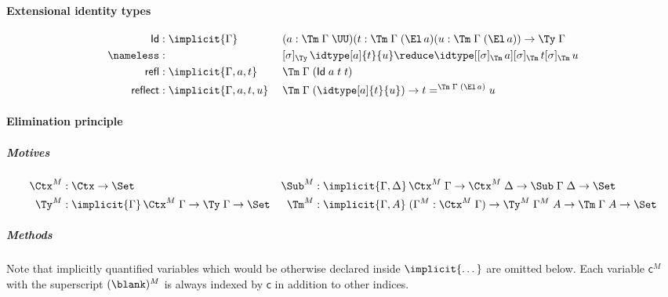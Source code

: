 \documentclass[a4paper,UKenglish,numberwithinsect,cleveref,thm-restate]{lipics-v2021}
\begin{document}
\paragraph*{Extensional identity types}

\begin{alignat*}{5}
  \mathsf{Id} & : \implicit{\Gamma} && (a : \Tm\;\Gamma\;\UU) (t : \Tm\;\Gamma\;(\El\,a)(u : \Tm\;\Gamma\;(\El\,a)) \to \Ty\;\Gamma \\
  \nameless & : && [ \sigma ]_{\Ty}\, \idtype[a]{t}{u} \reduce \idtype[{[\sigma]_{\Tm}\,a}]{[\sigma]_{\Tm}\,t}{[\sigma]_{\Tm}\,u} \\
  \mathsf{refl} & : \implicit{\Gamma, a, t}\;&&\Tm\;\Gamma\;(\mathsf{Id}\;a\;t\;t) \\
  \mathsf{reflect} & : \implicit{\Gamma, a, t, u}\;&& \Tm\;\Gamma\;(\idtype[a]{t}{u}) \to t =^{\Tm\;\Gamma\;(\El\,a)} u
\end{alignat*}

\paragraph*{Elimination principle}

\subparagraph*{Motives}
\begin{align*}
  \Ctx^M & : \Ctx \to \Set &
  \Sub^M & : \implicit{\Gamma, \Delta}\,\Ctx^M\;\Gamma \to \Ctx^M\;\Delta \to \Sub\;\Gamma\;\Delta \to \Set \\
  \Ty^M  & : \implicit{\Gamma}\,\Ctx^M\;\Gamma \to \Ty\;\Gamma \to \Set &
  \Tm^M  & : \implicit{\Gamma, A}\; (\Gamma^M : \Ctx^M\;\Gamma) \to \Ty^M\;\Gamma^M\;A \to \Tm\;\Gamma\;A \to \Set
\end{align*}

\subparagraph*{Methods}
Note that implicitly quantified variables which would be otherwise declared inside $\implicit{\dots}$ are omitted below.
Each variable $\mathsf{c}^M$ with the superscript $(\blank)^M$ is always indexed by $\mathsf{c}$ in addition to other indices.
\end{document}
